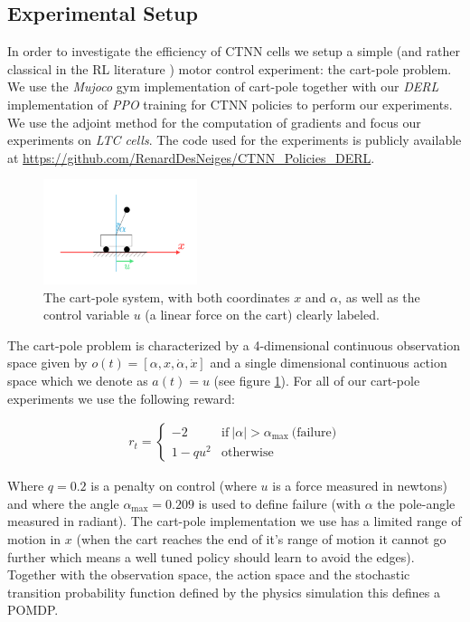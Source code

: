 \subsection{Experimental Setup}
\label{sec:exp_setup}
In order to investigate the efficiency of CTNN cells we setup a simple (and rather classical in the RL literature \cite{cartpoleSutton}) motor control experiment: the cart-pole problem. We use the \textit{Mujoco} gym implementation of cart-pole together with our \textit{DERL} implementation of \textit{PPO} training for CTNN policies to perform our experiments. We use the adjoint method for the computation of gradients and focus our experiments on \textit{LTC cells}. The code used for the experiments is publicly available at \url{https://github.com/RenardDesNeiges/CTNN_Policies_DERL}.\\

\begin{figure}[h!]
    \centering
    \includegraphics[width=0.4\textwidth]{figures/cartpole.pdf}
    \caption{The cart-pole system, with both coordinates $x$ and $\alpha$, as well as the control variable $u$ (a linear force on the cart) clearly labeled.}
    \label{fig:cartpole_scheme}
\end{figure}

The cart-pole problem is characterized by a 4-dimensional continuous observation space given by $o(t)=[\alpha,x,\dot{\alpha},\dot{x}]$ and a single dimensional continuous action space which we denote as $a(t) = u$ (see figure \ref{fig:cartpole_scheme}). For all of our cart-pole experiments we use the following reward: 

\begin{align*}
    r_t = 
    \begin{cases}
        -2 & \text{if} ~|\alpha|>\alpha_\text{max} ~\text{(failure)}\\
        1-q u^2 & \text{otherwise} 
    \end{cases}
\end{align*}

Where $q=0.2$ is a penalty on control (where $u$ is a force measured in newtons) and where the angle $\alpha_\text{max}=0.209$ is used to define failure (with $\alpha$ the pole-angle measured in radiant). The cart-pole implementation we use has a limited range of motion in $x$ (when the cart reaches the end of it's range of motion it cannot go further which means a well tuned policy should learn to avoid the edges). Together with the observation space, the action space and the stochastic transition probability function defined by the physics simulation this defines a POMDP. \\

